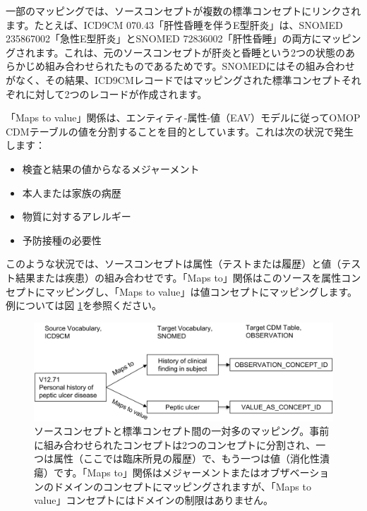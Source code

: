 \documentclass[
  11pt]{book}
\providecommand{\tightlist}{%
  \setlength{\itemsep}{0pt}\setlength{\parskip}{0pt}}
\theoremstyle{definition}
\theoremstyle{definition}
\theoremstyle{definition}
\theoremstyle{definition}
\theoremstyle{remark}
\begin{document}
一部のマッピングでは、ソースコンセプトが複数の標準コンセプトにリンクされます。たとえば、ICD9CM 070.43「肝性昏睡を伴うE型肝炎」は、SNOMED 235867002「急性E型肝炎」とSNOMED 72836002「肝性昏睡」の両方にマッピングされます。これは、元のソースコンセプトが肝炎と昏睡という2つの状態のあらかじめ組み合わせられたものであるためです。SNOMEDにはその組み合わせがなく、その結果、ICD9CMレコードではマッピングされた標準コンセプトそれぞれに対して2つのレコードが作成されます。

「Maps to value」関係は、エンティティ-属性-値（EAV）モデルに従ってOMOP CDMテーブルの値を分割することを目的としています。これは次の状況で発生します：

\begin{itemize}
\tightlist
\item
  検査と結果の値からなるメジャーメント
\item
  本人または家族の病歴
\item
  物質に対するアレルギー
\item
  予防接種の必要性
\end{itemize}

このような状況では、ソースコンセプトは属性（テストまたは履歴）と値（テスト結果または疾患）の組み合わせです。「Maps to」関係はこのソースを属性コンセプトにマッピングし、「Maps to value」は値コンセプトにマッピングします。例については図 \ref{fig:conceptValue}を参照ください。

\begin{figure}

{\centering \includegraphics[width=1\linewidth]{images/StandardizedVocabularies/conceptValue} 

}

\caption{ソースコンセプトと標準コンセプト間の一対多のマッピング。事前に組み合わせられたコンセプトは2つのコンセプトに分割され、一つは属性（ここでは臨床所見の履歴）で、もう一つは値（消化性潰瘍）です。「Maps to」関係はメジャーメントまたはオブザベーションのドメインのコンセプトにマッピングされますが、「Maps to value」コンセプトにはドメインの制限はありません。}\label{fig:conceptValue}
\end{figure}
\end{document}

